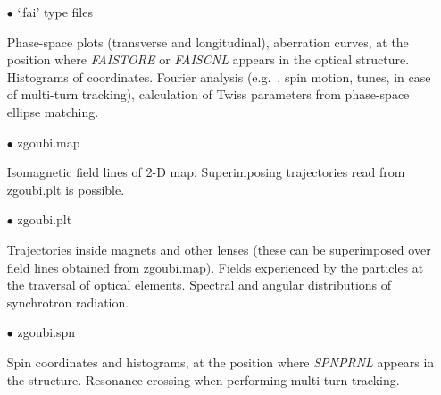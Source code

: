 \begin{itemize}
\item[$\bullet$] `.fai' type files 
  
  Phase-space plots (transverse and longitudinal), 
aberration curves, at the position where \textsl{FAISTORE}  or \textsl{FAISCNL} 
appears in the 
optical structure. Histograms of coordinates. Fourier analysis 
(e.g.~, spin motion, tunes, in case of multi-turn tracking), 
calculation of Twiss parameters from phase-space  ellipse matching.
\item[$\bullet$] zgoubi.map 
  
  Isomagnetic field lines of  2-D map. Superimposing 
trajectories read from zgoubi.plt is possible.
\item[$\bullet$] zgoubi.plt 
  
Trajectories inside magnets and other lenses (these can 
be superimposed over field lines obtained from zgoubi.map). 
Fields experienced by the particles at the traversal of optical 
elements. Spectral and angular distributions of synchrotron radiation.
\item[$\bullet$] zgoubi.spn
  
Spin coordinates and histograms, at the position where 
\textsl{SPNPRNL} appears in the structure. Resonance crossing when 
performing multi-turn tracking. 
\end{itemize}



